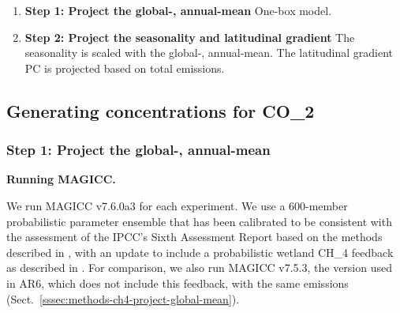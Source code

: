 \begin{enumerate}
{        \begin{enumerate}
            \item {
                \textbf{Step 1: Project the global-, annual-mean}
                One-box model.
            }
            \item {
                \textbf{Step 2: Project the seasonality and latitudinal gradient}
                The seasonality is scaled with the global-, annual-mean.
                The latitudinal gradient PC is projected based on total emissions.
            }
        \end{enumerate}
    }
\end{enumerate}

\subsection{Generating concentrations for CO_2}
\label{ssec:methods-co2}


\subsubsection{Step 1: Project the global-, annual-mean}
\label{sssec:methods-co2-project-global-mean}

\textbf{Running MAGICC.}

We run MAGICC v7.6.0a3
for each experiment.
We use a 600-member probabilistic parameter ensemble
that has been calibrated to be consistent with the assessment of the IPCC's Sixth Assessment Report \citep{IPCC_AR6-WG1-Ch-7_2021}
based on the methods described in \citet{meinshausen_emission-targets_2009,nicholls_rcmip-phase-2_2021},
with an update to include a probabilistic wetland CH_4 feedback as described in \citet{sloughter_magicc-ch4-feedbacks_2026}.
For comparison, we also run MAGICC v7.5.3, the version used in AR6, which does not include this feedback,
with the same emissions (Sect.~\ref{sssec:methods-ch4-project-global-mean}).

